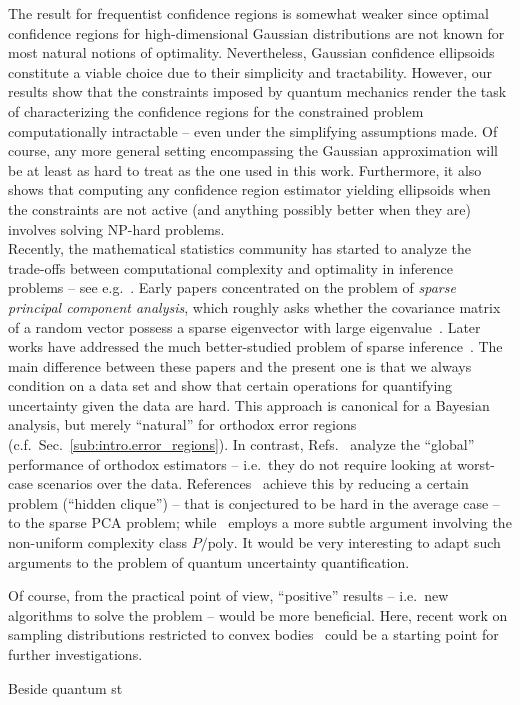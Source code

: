 The result for frequentist confidence regions is somewhat weaker since optimal confidence regions for high-dimensional Gaussian distributions are not known for most natural notions of optimality.
Nevertheless, Gaussian confidence ellipsoids constitute a viable choice due to their simplicity and tractability.
However, our results show that the constraints imposed by quantum mechanics render the task of characterizing the confidence regions for the constrained problem computationally intractable -- even under the simplifying assumptions made.
Of course, any more general setting encompassing the Gaussian approximation will be at least as hard to treat as the one used in this work.
Furthermore, it also shows that computing any confidence region estimator yielding ellipsoids when the constraints are not active (and anything possibly better when they are) involves solving NP-hard problems.\\


Recently, the mathematical statistics community has started to analyze the trade-offs between computational complexity and optimality in inference problems -- see e.g.\
\cite{Berthet_2013_Complexity,Berthet_2013_Computational,Zhang_2014_Lower}.
Early papers concentrated on the problem of \emph{sparse principal component analysis}, which roughly asks whether the covariance matrix of a random vector possess a sparse eigenvector with large eigenvalue~\cite{Berthet_2013_Complexity,Berthet_2013_Computational,Zhang_2014_Lower}.
Later works have addressed the much better-studied problem of sparse inference~\cite{Zhang_2014_Lower}.
The main difference between these papers and the present one is that we always condition on a data set and show that certain operations for quantifying uncertainty given the data are hard.
This approach is canonical for a Bayesian analysis, but merely ``natural'' for orthodox error regions (c.f.~Sec.~\ref{sub:intro.error_regions}).
In contrast, Refs.~\cite{Berthet_2013_Complexity,Berthet_2013_Computational,Zhang_2014_Lower} analyze the ``global'' performance of orthodox estimators -- i.e.\ they do not require looking at worst-case scenarios over the data.
References~\cite{Berthet_2013_Complexity,Berthet_2013_Computational,Zhang_2014_Lower} achieve this by reducing a certain problem (``hidden clique'') -- that is conjectured to be hard in the average case -- to the sparse PCA problem; while~\cite{Zhang_2014_Lower} employs a more subtle argument involving the non-uniform complexity class $P/\mathrm{poly}$.
It would be very interesting to adapt such arguments to the problem of quantum uncertainty quantification.


Of course, from the practical point of view, ``positive'' results -- i.e.\ new algorithms to solve the problem -- would be more beneficial.
Here, recent work on sampling distributions restricted to convex bodies~\cite{Cousins_2013_Cubic,Cousins_2015_Bypassing} could be a starting point for further investigations.

Beside quantum st

